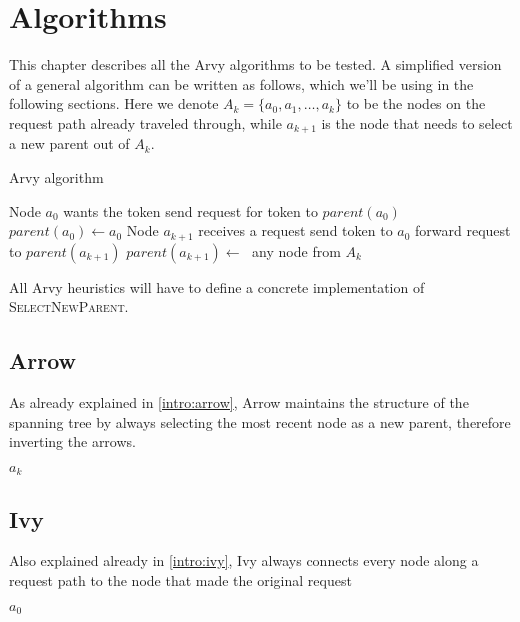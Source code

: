 \documentclass[a4paper, oneside]{discothesis}
\begin{document}
\chapter{Algorithms}\label{algs}

This chapter describes all the Arvy algorithms to be tested. A simplified version of a general algorithm can be written as follows, which we'll be using in the following sections. Here we denote $A_k=\{a_0,a_1,\dots,a_k\}$ to be the nodes on the request path already traveled through, while $a_{k+1}$ is the node that needs to select a new parent out of $A_k$.

\begin{algorithm}
\caption{Arvy algorithm}
\label{arvyalg}
\begin{algorithmic}
\Comment Node $a_{0}$ wants the token
    \State send request for token to $parent(a_{0})$
    \State $parent(a_{0})\gets a_{0}$
\EndIf
\EndFunction
{}
\Comment Node $a_{k+1}$ receives a request
    \State send token to $a_{0}$
\Else
    \State forward request to $parent(a_{k+1})$
\EndIf
\State $parent(a_{k+1})\gets\;$
\EndFunction
{}
\State\Return any node from $A_k$
\EndFunction
\end{algorithmic}
\end{algorithm}

All Arvy heuristics will have to define a concrete implementation of \textsc{SelectNewParent}.

\section{Arrow}

As already explained in \autoref{intro:arrow}, Arrow maintains the structure of the spanning tree by always selecting the most recent node as a new parent, therefore inverting the arrows.
\begin{algorithmic}
\State\Return $a_k$
\EndFunction
\end{algorithmic}

\section{Ivy}

Also explained already in \autoref{intro:ivy}, Ivy always connects every node along a request path to the node that made the original request
\begin{algorithmic}
\State\Return $a_0$
\EndFunction
\end{algorithmic}
\end{document}
